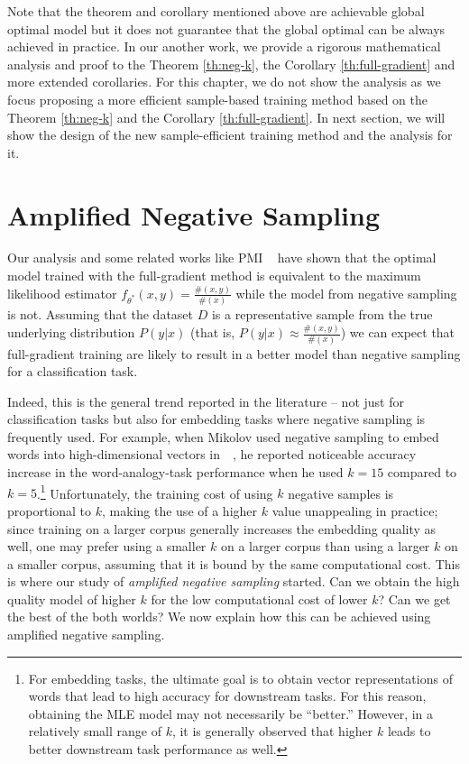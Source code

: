 Note that the theorem and corollary mentioned above are achievable global optimal model but it does not guarantee that the global optimal can be always achieved in practice.  In our another work, we provide a rigorous mathematical analysis and proof to the Theorem \ref{th:neg-k}, the Corollary \ref{th:full-gradient} and more extended corollaries. For this chapter, we do not show the analysis as we focus proposing a more efficient sample-based training method based on the Theorem \ref{th:neg-k} and the Corollary \ref{th:full-gradient}. In next section, we will show the design of the new sample-efficient training method and the analysis for it. 
 
\section{Amplified Negative Sampling}
\label{sec:NS:amplified}
Our analysis  and some related works like PMI ~\citep{levy2014neural} have shown that the optimal model 
trained with the full-gradient method is equivalent to 
the maximum likelihood estimator $f_{\theta^*}(x, y) = \frac{\#(x,y)}{\#(x)}$
while the model from negative sampling is not.
Assuming that the dataset $D$ is a representative sample from the true underlying distribution $P(y|x)$ (that is, $P(y|x) \approx \frac{\#(x,y)}{\#(x)}$) we can expect that full-gradient training are likely to result in a better model than negative sampling for a classification task.

Indeed, this is the general trend reported in the literature -- not just for classification tasks but also for embedding tasks where negative sampling is frequently used. For example, when Mikolov used negative sampling to embed words into high-dimensional vectors in~~\citep{mikolov2013distributed}, he reported noticeable accuracy increase in the word-analogy-task performance when he used $k=15$ compared to $k=5$.\footnote{For embedding tasks, the ultimate goal is to obtain vector representations of words that lead to high accuracy for downstream tasks. For this reason, obtaining the MLE model may not necessarily be ``better.'' However, in a relatively small range of $k$, it is generally observed that higher $k$ leads to better downstream task performance as well.} Unfortunately, the training cost of using $k$ negative samples is proportional to $k$, making the use of a higher $k$ value unappealing in practice; since training on a larger corpus generally increases the embedding quality as well, one may prefer using a smaller $k$ on a larger corpus than using a larger $k$ on a smaller corpus, assuming that it is bound by the same computational cost. This is where our study of \emph{amplified negative sampling} started. Can we obtain the high quality model of higher $k$ for the low computational cost of lower $k$? Can we get the best of the both worlds? We now explain how this can be achieved using amplified negative sampling.


